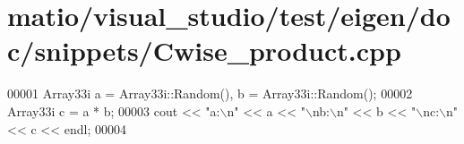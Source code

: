 \hypertarget{matio_2visual__studio_2test_2eigen_2doc_2snippets_2_cwise__product_8cpp_source}{}\section{matio/visual\+\_\+studio/test/eigen/doc/snippets/\+Cwise\+\_\+product.cpp}
\label{matio_2visual__studio_2test_2eigen_2doc_2snippets_2_cwise__product_8cpp_source}

\begin{DoxyCode}
00001 Array33i a = Array33i::Random(), b = Array33i::Random();
00002 Array33i c = a * b;
00003 cout << \textcolor{stringliteral}{"a:\(\backslash\)n"} << a << \textcolor{stringliteral}{"\(\backslash\)nb:\(\backslash\)n"} << b << \textcolor{stringliteral}{"\(\backslash\)nc:\(\backslash\)n"} << c << endl;
00004 
\end{DoxyCode}
